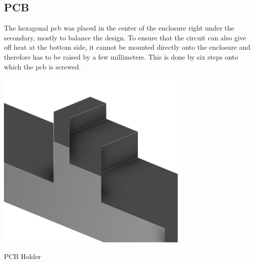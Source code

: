 \subsection{PCB}

The hexagonal \gls{pcb} was placed in the center of the enclosure right under the secondary, mostly to balance the design. To ensure that the circuit can also give off heat at the bottom side, it cannot be mounted directly onto the enclosure and therefore has to be raised by a few millimeters. This is done by six steps onto which the \gls{pcb} is screwed. 

\begin{marginfigure}[-3cm]
    \centering
    \includegraphics[width=0.7\textwidth]{kassandra/resources/JerJerWoBistDuStufe.PNG}
    \caption{PCB Holder}
    \label{fig:bottom_stufe}
\end{marginfigure}
    
